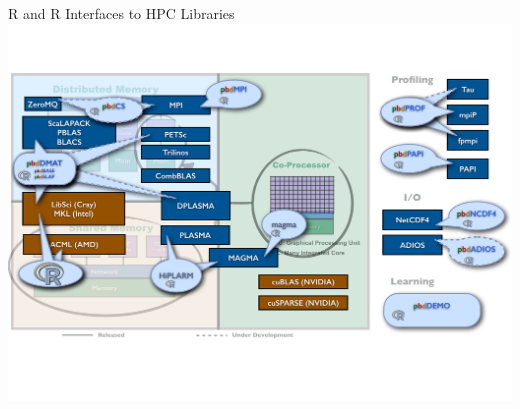\begin{frame}{R and \pbdR R Interfaces to HPC Libraries}
\includegraphics[height=\textheight]
{../common/pics/hardware/ParallelHardware26.pdf}
\end{frame}

